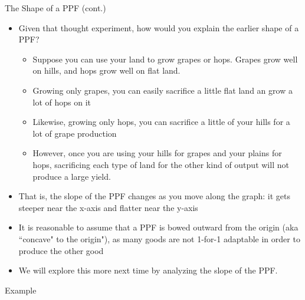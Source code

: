 \documentclass[10pt,xcolor={svgnames}]{beamer}
\begin{document}
\begin{frame}{The Shape of a PPF (cont.)}
\begin{itemize}[<+->]
    \item Given that thought experiment, how would you explain the earlier shape of a PPF? 
    \begin{itemize}
        \item Suppose you can use your land to grow grapes or hops. Grapes grow well on hills, and hops grow well on flat land. 
        \item Growing only grapes, you can easily sacrifice a little flat land an grow a lot of hops on it
        \item Likewise, growing only hops, you can sacrifice a little of your hills for a lot of grape production
        \item However, once you are using your hills for grapes and your plains for hops, sacrificing each type of land for the other kind of output will not produce a large yield. 
    \end{itemize}

    \item That is, the slope of the PPF changes as you move along the graph: it gets steeper near the x-axis and flatter near the y-axis
    \item It is reasonable to assume that a PPF is bowed outward from the origin (aka ``concave" to the origin"), as many goods are not 1-for-1 adaptable in order to produce the other good
    \item We will explore this more next time by analyzing the slope of the PPF. 
\end{itemize}
\end{frame}

\begin{frame}{Example}
    
\end{frame}
\end{document}
